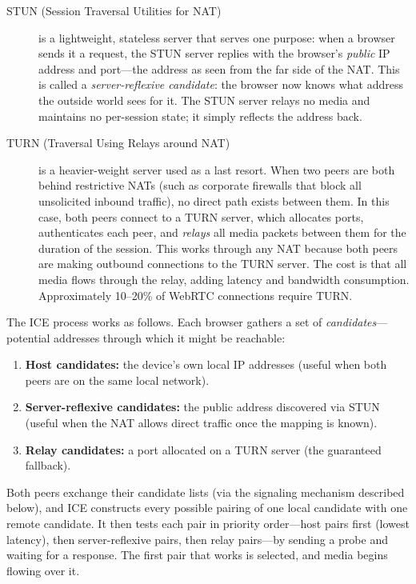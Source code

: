 \documentclass[11pt]{article}
\begin{document}
\begin{description}
  \item[STUN (Session Traversal Utilities for NAT)] is a lightweight,
    stateless server that serves one purpose: when a browser sends it a
    request, the STUN server replies with the browser's \emph{public} IP
    address and port---the address as seen from the far side of the NAT.
    This is called a \emph{server-reflexive candidate}: the browser now knows
    what address the outside world sees for it.  The STUN server relays no
    media and maintains no per-session state; it simply reflects the
    address back.

  \item[TURN (Traversal Using Relays around NAT)] is a heavier-weight server
    used as a last resort.  When two peers are both behind restrictive NATs
    (such as corporate firewalls that block all unsolicited inbound traffic),
    no direct path exists between them.  In this case, both peers connect to a
    TURN server, which allocates ports, authenticates each peer, and
    \emph{relays} all media packets between them for the duration of the
    session.  This works through any NAT because both peers are making
    outbound connections to the TURN server.  The cost is that all media flows
    through the relay, adding latency and bandwidth consumption.
    Approximately 10--20\% of WebRTC connections require TURN.
\end{description}

The ICE process works as follows.  Each browser gathers a set of
\emph{candidates}---potential addresses through which it might be
reachable:

\begin{enumerate}
  \item \textbf{Host candidates:} the device's own local IP addresses
    (useful when both peers are on the same local network).
  \item \textbf{Server-reflexive candidates:} the public address discovered
    via STUN (useful when the NAT allows direct traffic once the mapping is
    known).
  \item \textbf{Relay candidates:} a port allocated on a TURN server
    (the guaranteed fallback).
\end{enumerate}

Both peers exchange their candidate lists (via the signaling mechanism
described below), and ICE constructs every possible pairing of one local
candidate with one remote candidate.  It then tests each pair in priority
order---host pairs first (lowest latency), then server-reflexive pairs, then
relay pairs---by sending a probe and waiting for a response.  The first pair
that works is selected, and media begins flowing over it.
\end{document}
